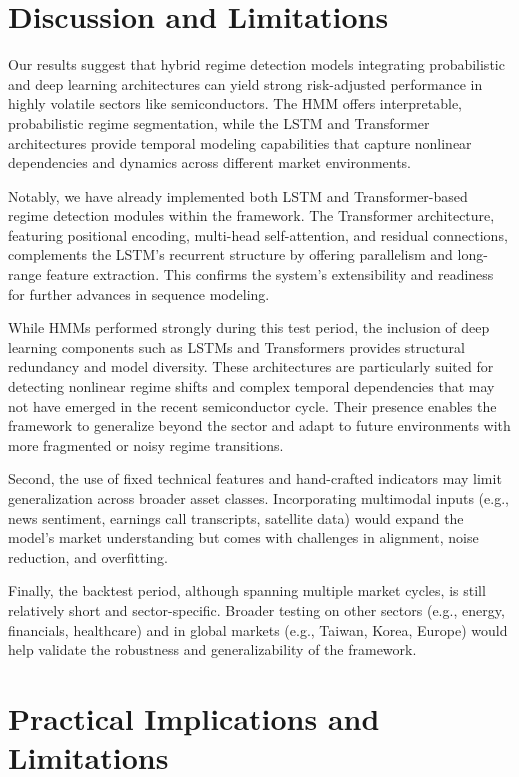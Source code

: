 \section{Discussion and Limitations}
Our results suggest that hybrid regime detection models integrating probabilistic and deep learning architectures can yield strong risk-adjusted performance in highly volatile sectors like semiconductors. The HMM offers interpretable, probabilistic regime segmentation, while the LSTM and Transformer architectures provide temporal modeling capabilities that capture nonlinear dependencies and dynamics across different market environments.

Notably, we have already implemented both LSTM and Transformer-based regime detection modules within the framework. The Transformer architecture, featuring positional encoding, multi-head self-attention, and residual connections, complements the LSTM's recurrent structure by offering parallelism and long-range feature extraction. This confirms the system’s extensibility and readiness for further advances in sequence modeling.

While HMMs performed strongly during this test period, the inclusion of deep learning components such as LSTMs and Transformers provides structural redundancy and model diversity. These architectures are particularly suited for detecting nonlinear regime shifts and complex temporal dependencies that may not have emerged in the recent semiconductor cycle. Their presence enables the framework to generalize beyond the sector and adapt to future environments with more fragmented or noisy regime transitions.

Second, the use of fixed technical features and hand-crafted indicators may limit generalization across broader asset classes. Incorporating multimodal inputs (e.g., news sentiment, earnings call transcripts, satellite data) would expand the model’s market understanding but comes with challenges in alignment, noise reduction, and overfitting.

Finally, the backtest period, although spanning multiple market cycles, is still relatively short and sector-specific. Broader testing on other sectors (e.g., energy, financials, healthcare) and in global markets (e.g., Taiwan, Korea, Europe) would help validate the robustness and generalizability of the framework.

\section{Practical Implications and Limitations}

